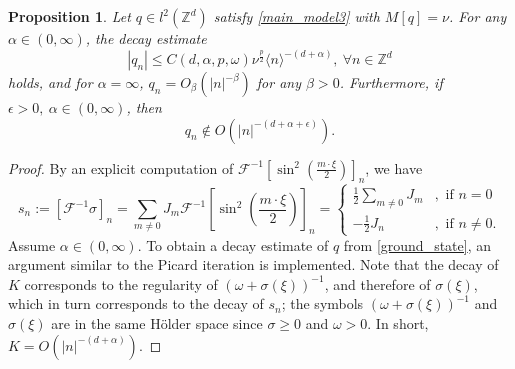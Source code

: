 \documentclass{article}
\numberwithin{equation}{section}
\newtheorem{proposition}{Proposition}[section]
\begin{document}
\begin{proposition}\label{algebraic_decay}
Let $q \in l^2(\mathbb{Z}^d)$ satisfy \eqref{main_model3} with $M[q] = \nu$. For any $\alpha \in (0,\infty)$, the decay estimate 
\begin{equation}\label{decay2}
    |q_n| \leq C(d,\alpha,p,\omega) \nu^{\frac{p}{2}} \langle n \rangle^{-(d+\alpha)},\ \forall n \in \mathbb{Z}^d 
\end{equation}
holds, and for $\alpha = \infty$, $q_n = O_{\beta}(|n|^{-\beta})$ for any $\beta > 0$. Furthermore, if $\epsilon > 0,\ \alpha \in (0,\infty)$, then
\begin{equation}
q_n \notin O(|n|^{-(d+\alpha+\epsilon)}).    
\end{equation}
\end{proposition}
\begin{proof}
By an explicit computation of $\mathcal{F}^{-1} [\sin^2 \left(\frac{m \cdot \xi}{2}\right)]_n$, we have
\begin{equation}\label{fourier}
    s_n := [\mathcal{F}^{-1} \sigma]_n = \sum_{m \neq 0} J_{m} \mathcal{F}^{-1} [\sin^2 \left(\frac{m \cdot \xi}{2}\right)]_n =
    \begin{cases}
            \frac{1}{2} \sum\limits_{m \neq 0} J_{m}
            & ,\text{ if } n = 0\\
            -\frac{1}{2} J_{n} & ,\text{ if } n \neq 0.
    \end{cases}
\end{equation}
Assume $\alpha \in (0,\infty)$. To obtain a decay estimate of $q$ from \eqref{ground_state}, an argument similar to the Picard iteration is implemented. Note that the decay of $K$ corresponds to the regularity of $(\omega + \sigma(\xi))^{-1}$, and therefore of $\sigma(\xi)$, which in turn corresponds to the decay of $s_n$; the symbols $(\omega + \sigma(\xi))^{-1}$ and $\sigma(\xi)$ are in the same H\"older space since $\sigma \geq 0$ and $\omega > 0$. In short, $K = O(|n|^{-(d+\alpha)})$.


\end{proof}
\end{document}
